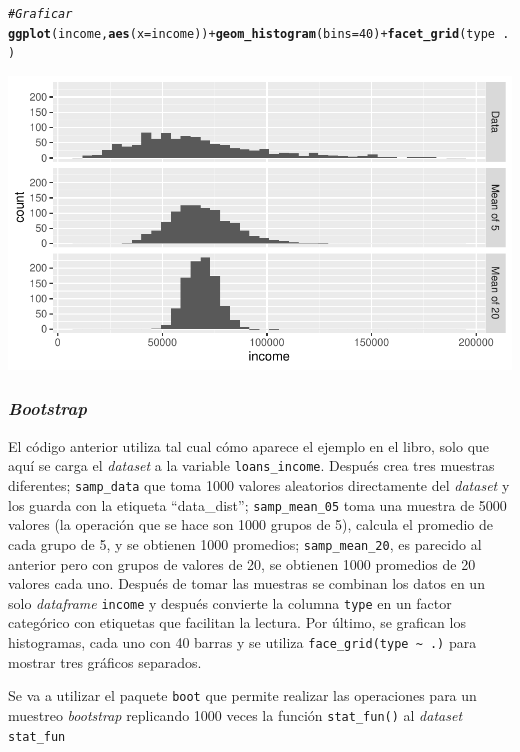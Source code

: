 \documentclass[12pt]{article}\usepackage[]{graphicx}\usepackage[]{xcolor}
\makeatletter
\def\maxwidth{ %
  \ifdim\Gin@nat@width>\linewidth
    \linewidth
  \else
    \Gin@nat@width
  \fi
}
\newcommand{\hlnum}[1]{\textcolor[rgb]{0.686,0.059,0.569}{#1}}%
\newcommand{\hlcom}[1]{\textcolor[rgb]{0.678,0.584,0.686}{\textit{#1}}}%
\newcommand{\hlopt}[1]{\textcolor[rgb]{0,0,0}{#1}}%
\newcommand{\hldef}[1]{\textcolor[rgb]{0.345,0.345,0.345}{#1}}%
\newcommand{\hlkwc}[1]{\textcolor[rgb]{0.333,0.667,0.333}{#1}}%
\newcommand{\hlkwd}[1]{\textcolor[rgb]{0.737,0.353,0.396}{\textbf{#1}}}%
\newenvironment{kframe}{%
 \def\at@end@of@kframe{}%
 \ifinner\ifhmode%
  \def\at@end@of@kframe{\end{minipage}}%
  \begin{minipage}{\columnwidth}%
 \fi\fi%
 \def\FrameCommand##1{\hskip\@totalleftmargin \hskip-\fboxsep
 \colorbox{shadecolor}{##1}\hskip-\fboxsep
     \hskip-\linewidth \hskip-\@totalleftmargin \hskip\columnwidth}%
 \MakeFramed {\advance\hsize-\width
   \@totalleftmargin\z@ \linewidth\hsize
   \@setminipage}}%
 {\par\unskip\endMakeFramed%
 \at@end@of@kframe}
\newenvironment{knitrout}{}{} %
\makeatother
\begin{document}
\begin{knitrout}
\begin{kframe}
\begin{alltt}
\hlcom{# Graficar}
\hlkwd{ggplot}\hldef{(income,} \hlkwd{aes}\hldef{(}\hlkwc{x}\hldef{=income))}\hlopt{+}\hlkwd{geom_histogram}\hldef{(}\hlkwc{bins}\hldef{=}\hlnum{40}\hldef{)}\hlopt{+}\hlkwd{facet_grid}\hldef{(type} \hlopt{~} \hldef{.)}
\end{alltt}
\end{kframe}
\includegraphics[width=\maxwidth]{figure/unnamed-chunk-12-1} 
\end{knitrout}


\subsubsection{\textit{Bootstrap}}

El código anterior utiliza tal cual cómo aparece el ejemplo en el libro, solo que aquí se carga el \textit{dataset} a la variable \lstinline|loans_income|. Después crea tres muestras diferentes; \lstinline|samp_data| que toma 1000 valores aleatorios directamente del \textit{dataset} y los guarda con la etiqueta ``data\_dist''; \lstinline|samp_mean_05| toma una muestra de 5000 valores (la operación que se hace son 1000 grupos de 5), calcula el promedio de cada grupo de 5, y se obtienen 1000 promedios; \lstinline|samp_mean_20|, es parecido al anterior pero con grupos de valores de 20, se obtienen 1000 promedios de 20 valores cada uno. Después de tomar las muestras se combinan los datos en un solo \textit{dataframe} \lstinline|income| y después convierte la columna \lstinline|type| en un factor categórico con etiquetas que facilitan la lectura. Por último, se grafican los histogramas, cada uno con 40 barras y se utiliza \lstinline|face_grid(type ~ .)| para mostrar tres gráficos separados.

Se va a utilizar el paquete \texttt{boot} que permite realizar las operaciones para un muestreo \textit{bootstrap} replicando 1000 veces la función \lstinline|stat_fun()| al \textit{dataset} \lstinline|stat_fun|
\end{document}
